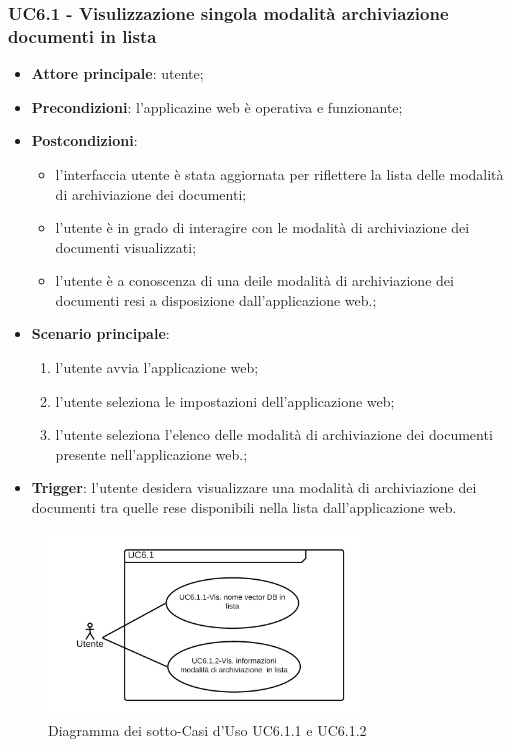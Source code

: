 \documentclass[10pt, a4paper]{article}
\begin{document}
    \subsubsection{UC6.1 - Visulizzazione singola modalità archiviazione documenti in lista}
    \begin{itemize}
        \item \textbf{Attore principale}: utente;
        \item \textbf{Precondizioni}: l'applicazine web è operativa e funzionante;
        \item \textbf{Postcondizioni}: 
        \begin{itemize}
            \item l'interfaccia utente è stata aggiornata per riflettere la lista delle modalità di archiviazione dei documenti;
            \item l'utente è in grado di interagire con le modalità di archiviazione dei documenti visualizzati;
            \item l'utente è a conoscenza di una deile modalità di archiviazione dei documenti resi a disposizione dall'applicazione web.;
        \end{itemize} 
        \item \textbf{Scenario principale}:
            \begin{enumerate}
                \item l'utente avvia l'applicazione web;
                \item l'utente seleziona le impostazioni dell'applicazione web;
                \item l'utente seleziona l'elenco delle modalità di archiviazione dei documenti presente nell'applicazione web.;
            \end{enumerate}
        \item \textbf{Trigger}: l'utente desidera visualizzare una modalità di archiviazione dei documenti tra quelle rese disponibili nella lista dall'applicazione web.
    \end{itemize}

    \begin{figure}[h]
        \centering
        \includegraphics[width=0.75\textwidth, height=0.75\textheight, keepaspectratio]{UC-images/UC6.1.1-UC6.1.2.png}
        \caption{Diagramma dei sotto-Casi d'Uso UC6.1.1 e UC6.1.2}
    \end{figure}
        
\end{document}
